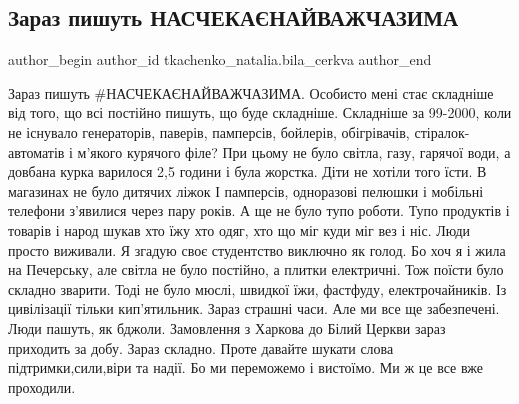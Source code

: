  
 
 
 
 

\subsection{Зараз пишуть НАСЧЕКАЄНАЙВАЖЧАЗИМА}
\label{sec:17_11_2022.fb.tkachenko_natalia.bila_cerkva.1.zaraz_pishut_naschek}

\ifcmt
 author_begin
   author_id tkachenko_natalia.bila_cerkva
 author_end
\fi

Зараз пишуть \#НАСЧЕКАЄНАЙВАЖЧАЗИМА. Особисто мені стає складніше від того, що
всі постійно пишуть, що буде складніше. Складніше за 99-2000, коли не існувало
генераторів, паверів, памперсів, бойлерів, обігрівачів, стіралок-автоматів і
м'якого курячого філе? При цьому не було світла, газу, гарячої води, а довбана
курка варилося 2,5 години і була жорстка. Діти не хотіли того їсти. В магазинах
не було дитячих ліжок І памперсів, одноразові пелюшки і мобільні телефони
з'явилися через пару років. А ще не було тупо роботи. Тупо продуктів і товарів
і народ шукав хто їжу хто одяг, хто що міг куди міг вез і ніс. Люди просто
виживали. Я згадую своє студентство виключно як  голод. Бо хоч я і жила на
Печерську, але світла не було постійно, а плитки електричні. Тож поїсти було
складно зварити. Тоді не було мюслі, швидкої їжи, фастфуду, електрочайників. Із
цивілізації тільки кип'ятильник. Зараз страшні часи. Але ми все ще забезпечені.
Люди пашуть, як бджоли. Замовлення з Харкова до Білий Церкви зараз приходить за
добу. Зараз складно. Проте давайте шукати слова підтримки,сили,віри та надії.
Бо ми переможемо і вистоїмо. Ми ж це все вже проходили.
